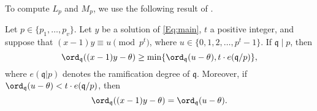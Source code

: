 {To compute $L_p$ and $M_p$, we use the following result of \cite{GhKaMaSi}.


\begin{lemma} \label{Lem:main}
Let $p \in \{p_1, \dots, p_v\}$. Let $y$ be a solution of \eqref{Eq:main}, $t$  a positive integer, and suppose that $(x-1)y \equiv u \pmod{p^t}$, where $u \in \{0,1,2,\dotsc,p^{t}-1\}$. If $\mathfrak{q} \mid p$, then
\[\ord_{\mathfrak{q}}((x-1)y-\theta)\ge \min\{\ord_{\mathfrak{q}}(u-\theta), t \cdot e(\mathfrak{q}/p)\},\]
where $e(\mathfrak{q}|p)$ denotes the ramification degree of $\mathfrak{q}$. 
Moreover, if $\ord_{\mathfrak{q}}(u-\theta) < t \cdot e(\mathfrak{q}/p)$,
then
\[\ord_\mathfrak{q}((x-1)y-\theta) = \ord_{\mathfrak{q}}(u-\theta).\]
\end{lemma}


}
